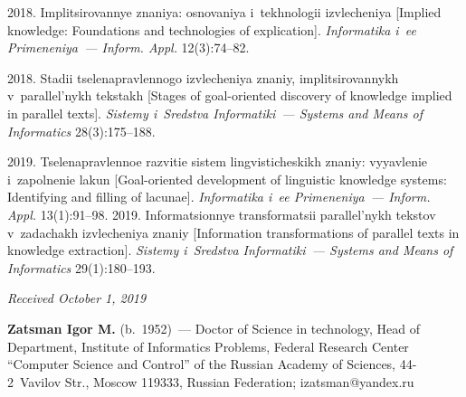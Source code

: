 \begin{multicols}{2}
{{\begin{thebibliography}{99}
 2018. Implitsirovannye znaniya: osnovaniya i~tekhnologii 
izvlecheniya [Implied knowledge: Foundations and technologies of explication]. 
\textit{Informatika i~ee Primeneniya~--- Inform. Appl.} 12(3):74--82.

 2018. Stadii tselenapravlennogo izvlecheniya znaniy, 
implitsirovannykh v~parallel'nykh tekstakh [Stages of goal-oriented discovery of 
knowledge implied in parallel texts]. \textit{Sistemy i~Sredstva Informatiki~--- 
Systems and Means of Informatics} 28(3):175--188.

 2019. Tselenapravlennoe razvitie sistem lingvisticheskikh 
znaniy: vyyavlenie i~zapolnenie lakun [Goal-oriented development of linguistic 
knowledge systems: Identifying and filling of lacunae]. \textit{Informatika i~ee 
Primeneniya~--- Inform. Appl.} 13(1):91--98.
 2019. Informatsionnye transformatsii 
parallel'nykh tekstov v~zadachakh izvlecheniya znaniy [Information transformations 
of parallel texts in knowledge extraction]. \textit{Sistemy i~Sredstva Informatiki~--- 
Systems and Means of Informatics} 29(1):180--193.
\end{thebibliography}

 }
 }

\end{multicols}

\vspace*{-6pt}

\hfill{\small\textit{Received October 1, 2019}}



\Contrl

\noindent
\textbf{Zatsman Igor M.} (b.\ 1952)~--- Doctor of Science in technology, Head of 
Department, Institute of Informatics Problems, Federal Research Center ``Computer 
Science and Control'' of the Russian Academy of Sciences,  44-2~Vavilov Str., Moscow 
119333, Russian Federation; \mbox{izatsman@yandex.ru}
\label{end\stat}

\renewcommand{\bibname}{\protect\rm Литература}  
    
       